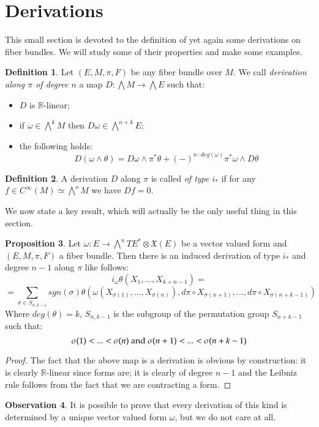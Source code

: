 \documentclass[12pt,a4paper]{report}
\theoremstyle{definition}
\newtheorem{Def}{Definition}[chapter]
\theoremstyle{Theorem}
\newtheorem{Prop}[Def]{Proposition}
\theoremstyle{break}
\theoremstyle{definition}
\newtheorem{Obs}[Def]{Observation}
\begin{document}
		\section{Derivations}
		This small section is devoted to the definition of yet again some derivations on fiber bundles. We will study some of their properties and make some examples.
		\begin{Def}
			Let $(E,M,\pi,F)$ be any fiber bundle over $M$. We call \textit{derivation along $\pi$ of degree $n$} a map $D:\bigwedge M\rightarrow \bigwedge E$ such that:
			\begin{itemize}
				\item $D$ is $\mathbb{R}$-linear;
				\item if $\omega\in\bigwedge^k M$ then $D\omega\in \bigwedge^{n+k}E$;
				\item the following holds:
				$$D(\omega\wedge \theta)=D\omega\wedge \pi^*\theta+(-)^{n\cdot deg(\omega)}\pi^*\omega\wedge D\theta$$
			\end{itemize}
		\end{Def}
		\begin{Def}
			A derivation $D$ along $\pi$ is called \textit{of type $i_*$} if for any $f\in C^\infty(M)\simeq \bigwedge^o M$ we have $Df=0$.
		\end{Def}
		We now state a key result, which will actually be the only useful thing in this section.
		\begin{Prop}
			Let $\omega:E\rightarrow \bigwedge^n TE^*\otimes \mathfrak{X}(E)$ be a vector valued form and $(E,M,\pi,F)$ a fiber bundle. Then there is an induced derivation of type $i_*$ and degree $n-1$ along $\pi$ like follows:
			$$i_\omega\theta(X_1,...,X_{k+n-1})=$$
			$$=\sum_{\sigma\in S_{n,k-1}}sgn(\sigma)\theta(\omega(X_{\sigma(1)},...,X_{\sigma(n)}),d\pi \circ X_{\sigma(n+1)},...,d\pi \circ X_{\sigma(n+k-1)})$$
			Where $deg(\theta)=k$, $S_{n,k-1}$ is the subgroup of the permutation group $S_{n+k-1}$ such that:
		$$\sigma(1)<...<\sigma(n)\hbox{ and }\sigma(n+1)<...<\sigma(n+k-1)$$
		\end{Prop}
		\begin{proof}
			The fact that the above map is a derivation is obvious by construction: it is clearly $\mathbb{R}$-linear since forms are; it is clearly of degree $n-1$ and the Leibniz rule follows from the fact that we are contracting a form.
		\end{proof}
		\begin{Obs}
			It is possible to prove that every derivation of this kind is determined by a unique vector valued form $\omega$, but we do not care at all.
		\end{Obs}
\end{document}
